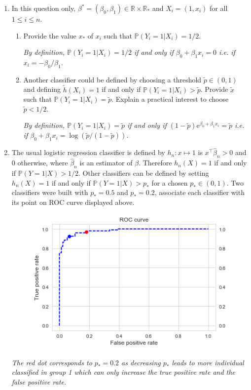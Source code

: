 \documentclass[a4paper,10pt,fleqn]{article}
\newcommand{\rset}{\ensuremath{\mathbb{R}}}
\newcommand{\1}{\ensuremath{\mathbbm{1}}}
\begin{document}
\begin{enumerate}
	\item In this question only,  $\beta^* = (\beta_0,\beta_1)\in \rset\times \rset_*$ and $X_i = (1,x_i)$ for all $1\leqslant i \leqslant n$.
\begin{enumerate}
\item Provide the value $x_*$ of $x_i$ such that $\mathbb{P}(Y_i=1 | X_i) = 1/2$. 

\vspace{.2cm}

{\em
By definition, $\mathbb{P}(Y_i=1 | X_i) = 1/2$ if and only if $\beta_0 + \beta_1x_i = 0$ i.e. if $x_i = -\beta_0/\beta_1$.
}
\item Another classifier could be defined by choosing a threshold $\tilde p\in(0,1)$ and defining $\tilde h(X_i) = 1$ if and only if $\mathbb{P}(Y_i=1 | X_i) > \tilde p$.  Provide $\tilde x$ such that $\mathbb{P}(Y_i=1 | X_i) = \tilde p$. Explain a practical interest to choose $\tilde p < 1/2$.

\vspace{.2cm}

{\em
By definition, $\mathbb{P}(Y_i=1 | X_i) = \tilde p$ if and only if $(1-\tilde p)\mathrm{e}^{\beta_0+\beta_1x_i} = \tilde p$ i.e. if $\beta_0 + \beta_1x_i = \log(\tilde p / (1-\tilde p))$.
}
\end{enumerate}
	\item The usual logistic regression classifier is defined by $h_n:x\mapsto 1$ is $x^\top\hat\beta_n >0$ and $0$ otherwise, where $\hat \beta_n$ is an estimator of $\beta$. Therefore $h_n(X) =1$ if and only if $\mathbb{P}(Y=1|X)>1/2$. Other classifiers can be defined by setting $h_n(X) =1$ if and only if $\mathbb{P}(Y=1|X)>p_*$ for a chosen $p_*\in(0,1)$. Two classifiers were built with $p_* = 0.5$ and $p_* = 0.2$, associate each classifier with its point on  ROC curve displayed above.

\begin{figure}[h!]
\label{fig:roc}
\centering
\includegraphics[scale = .45]{roc.png}
\end{figure}

\vspace{.2cm}

{\em
The red dot corresponds to $p_* = 0.2$ as decreasing $p_*$ leads to more individual classified in group 1 which can only increase the true positive rate and the false positive rate.
}
	
\end{enumerate}
\end{document}
